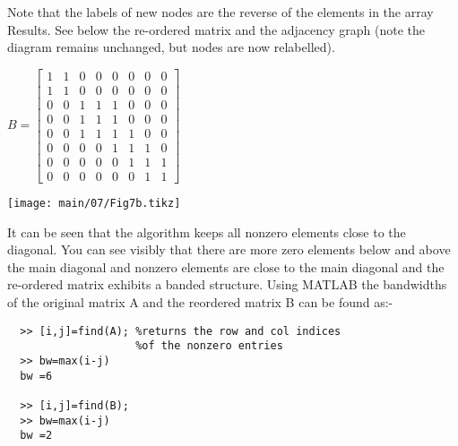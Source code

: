   \noindent
  Note that the labels of new nodes are the reverse of the elements in the array
  Results.  See below the re-ordered matrix and the adjacency graph (note the
  diagram remains unchanged, but nodes are now relabelled).
  \vskip 5pt
  \noindent
  \begin{table}[H]
    \begin{minipage}[b]{0.50\linewidth}
      \vskip 5pt
      \begin{center}
        $B=
        \begin{bmatrix}
          1 & 1 & 0 & 0 & 0 & 0 & 0 & 0 \\
          1 & 1 & 0 & 0 & 0 & 0 & 0 & 0 \\
          0 & 0 & 1 & 1 & 1 & 0 & 0 & 0 \\
          0 & 0 & 1 & 1 & 1 & 0 & 0 & 0 \\
          0 & 0 & 1 & 1 & 1 & 1 & 0 & 0 \\
          0 & 0 & 0 & 0 & 1 & 1 & 1 & 0 \\
          0 & 0 & 0 & 0 & 0 & 1 & 1 & 1 \\
          0 & 0 & 0 & 0 & 0 & 0 & 1 & 1
        \end{bmatrix}$
      \end{center}
      \vspace{5mm}
    \end{minipage}
    \begin{minipage}[b]{0.49\linewidth}
      \begin{center}
        \texttt{[image: main/07/Fig7b.tikz]}
      \end{center}
    \end{minipage}
  \end{table}
  \vskip -12pt
  \noindent
  It can be seen that the algorithm keeps all nonzero elements close to the
  diagonal.  You can see visibly that there are more zero elements below and above
  the main diagonal and nonzero elements are close to the main diagonal and the
  re-ordered matrix exhibits a banded structure.
  \vskip 6pt
  \noindent
  Using MATLAB the bandwidths of the original matrix A and the reordered matrix B
  can be found as:-
  \vskip 12pt
  \noindent
  \ttfamily
  \begin{lstlisting}
  >> [i,j]=find(A); %returns the row and col indices
                    %of the nonzero entries
  >> bw=max(i-j)
  bw =6
  
  >> [i,j]=find(B);
  >> bw=max(i-j)
  bw =2
  \end{lstlisting}
